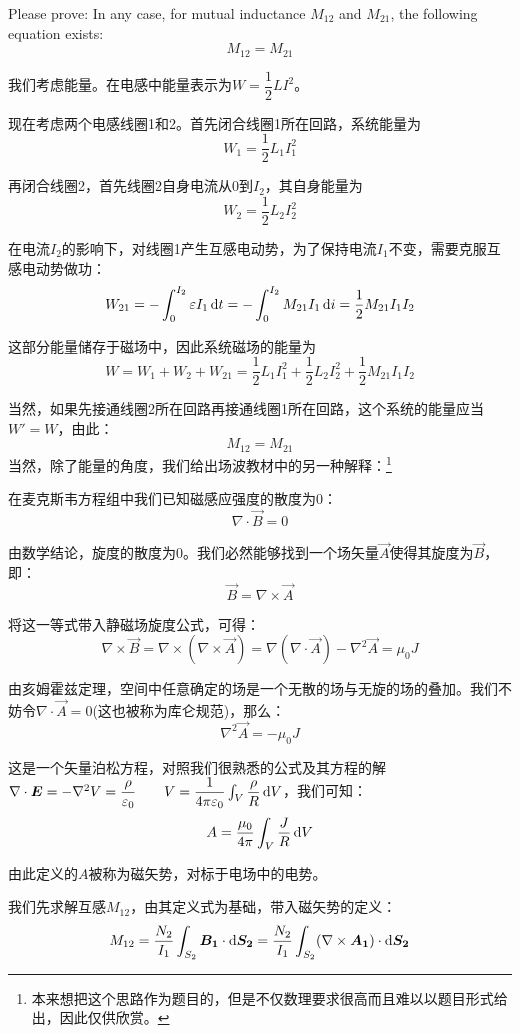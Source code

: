 \begin{solution}
    Please prove: In any case, for mutual inductance \(M_{12} \) and \(M_{21}\), the following equation exists: 
    \[M_{12} = M_{21}\]
    \tcbrule

    我们考虑能量。在电感中能量表示为$W = \dfrac{1}{2}LI^2$。
    
    现在考虑两个电感线圈1和2。首先闭合线圈1所在回路，系统能量为
    \[W_1 = \dfrac{1}{2}L_1 I_1^2\]

    再闭合线圈2，首先线圈2自身电流从0到$I_2$，其自身能量为
    \[W_2 = \dfrac{1}{2}L_2 I_2^2\]

    在电流$I_2$的影响下，对线圈1产生互感电动势，为了保持电流$I_1$不变，需要克服互感电动势做功：
    \[W_{21} = -\int_0^{I_2} \varepsilon I_1 \dif{t} = -\int_0^{I_2} M_{21} I_1 \dif{i} = \dfrac{1}{2}M_{21}I_{1}I_{2}\]
    
    这部分能量储存于磁场中，因此系统磁场的能量为
    \[W = W_1 + W_2 + W_{21} = \dfrac{1}{2}L_1 I_1^2 + \dfrac{1}{2}L_2 I_2^2 + \dfrac{1}{2}M_{21}I_{1}I_{2}\]

    当然，如果先接通线圈2所在回路再接通线圈1所在回路，这个系统的能量应当$W' = W$，由此：
    \[M_{12} = M_{21}\]
    \tcbrule
    当然，除了能量的角度，我们给出场波教材中的另一种解释：\footnote{本来想把这个思路作为题目的，但是不仅数理要求很高而且难以以题目形式给出，因此仅供欣赏。}

    在麦克斯韦方程组中我们已知磁感应强度的散度为0：
    \[\nabla \cdot \vec{B} = 0\]

    由数学结论，旋度的散度为0。我们必然能够找到一个场矢量$\vec{A}$使得其旋度为$\vec{B}$，即：
    \[\vec{B} = \nabla \times \vec{A}\]

    将这一等式带入静磁场旋度公式，可得：
    \[\nabla \times \vec{B} = \nabla \times (\nabla \times \vec{A}) = \nabla(\nabla\cdot\vec{A}) - \nabla^2 \vec{A} = \mu_0 J\]

    由亥姆霍兹定理，空间中任意确定的场是一个无散的场与无旋的场的叠加。我们不妨令$\nabla\cdot\vec{A} = 0$(这也被称为库仑规范)，那么：
    \[\nabla^2 \vec{A} = -\mu_0 J\]

    这是一个矢量泊松方程，对照我们很熟悉的公式及其方程的解$\nabla\cdot\vec{E} = -\nabla^2 V = \dfrac{\rho}{\varepsilon_0}\qquad V = \dfrac{1}{4\pi\varepsilon_0}\int_{V}\dfrac{\rho}{R}\dif{V}$，我们可知：
    \[A = \dfrac{\mu_0}{4\pi}\int_{V} \dfrac{J}{R}\dif{V}\]

    由此定义的$A$被称为磁矢势，对标于电场中的电势。

    我们先求解互感$M_{12}$，由其定义式为基础，带入磁矢势的定义：
    \[M_{12} = \dfrac{N_2}{I_1}\int_{S_2} \vec{B_1}\cdot\dif{\vec{S_2}} = \dfrac{N_2}{I_1}\int_{S_2} (\nabla\times\vec{A_1})\cdot\dif{\vec{S_2}}\]


\end{solution}
